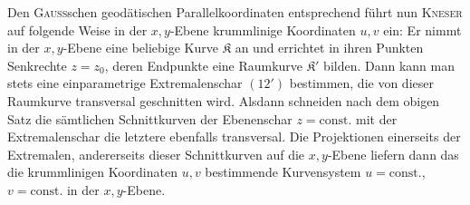 Den \textsc{Gauss}schen geodätischen Parallelkoordinaten entsprechend führt nun
\textsc{Kneser} auf folgende Weise in der $x,y$-Ebene krummlinige Koordinaten $u,v$
ein: Er nimmt in der $x,y$-Ebene eine beliebige Kurve $\mathfrak K$ an und errichtet in
ihren Punkten Senkrechte $z=z_0$, deren Endpunkte eine Raumkurve $\mathfrak K'$ bilden.
Dann kann man stets eine einparametrige Extremalenschar $(12')$ bestimmen,
die von dieser Raumkurve transversal geschnitten wird. Alsdann schneiden
nach dem obigen Satz die sämtlichen Schnittkurven der Ebenenschar $z=\text{const.}$
mit der Extremalenschar die letztere ebenfalls transversal. Die Projektionen
einerseits der Extremalen, andererseits dieser Schnittkurven auf die $x,y$-Ebene
liefern dann das die krummlinigen Koordinaten $u,v$ bestimmende Kurvensystem
$u=\text{const.}$, $v=\text{const.}$ in der $x,y$-Ebene.

